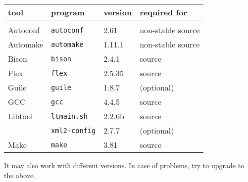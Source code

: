 \begin{tabular}{llll}
\textbf{tool}	& \textbf{program} & \textbf{version} & \textbf{required for} \\
\hline \\
\gnu{} Autoconf	& \texttt{autoconf}	  	& 2.61 		& non-stable source \\
\gnu{} Automake	& \texttt{automake} 	 	& 1.11.1	& non-stable source \\
\gnu{} Bison 		& \texttt{bison}  			& 2.4.1 	& source \\ 
Flex						& \texttt{flex} 				& 2.5.35 	& source \\
\gnu{} Guile		& \texttt{guile}				& 1.8.7 	& (optional) \\
GCC 						& \texttt{gcc}  				& 4.4.5 	& source \\
\gnu{} Libtool	& \texttt{ltmain.sh}  	& 2.2.6b 	& source \\
\libxml{}				& \texttt{xml2-config}	& 2.7.7 	& (optional) \\ 
\gnu{} Make			& \texttt{make}			 		& 3.81		& source \\
\end{tabular}

\medskip{}
\noindent{}It may also work with different versions. In case of problems, try to
upgrade to the above.
